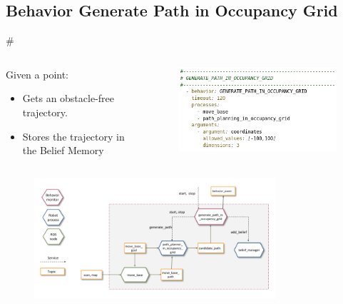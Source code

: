 \documentclass[]{beamer}
\def\mOrangeItem{\item[\textcolor{orange}{\textbullet}]}
\newcommand{\mSlideTitle}{{{\color{gray}\secname}} \# \subsecname}
\begin{document}
\subsection{Behavior Generate Path in Occupancy Grid}
\begin{frame}{\mSlideTitle}
  \begin{columns}
    \begin{column}{0.5\textwidth}
      \vspace{1.2em}

      Given a point:
      \begin{itemize}
        \mOrangeItem Gets an obstacle-free trajectory.
        \mOrangeItem Stores the trajectory in the Belief Memory
      \end{itemize}
    \end{column}
    \begin{column}{0.5\textwidth}
      \begin{figure}
        \centering
        \includegraphics[height=0.3\textheight,keepaspectratio]{BehaviorGPCatalog.png}
      \end{figure}
    \end{column}
  \end{columns}
  \begin{figure}
    \centering
    \includegraphics[width=0.8\textwidth]{BehaviorGPArquitecture.png}
  \end{figure}
\end{frame}
\end{document}
